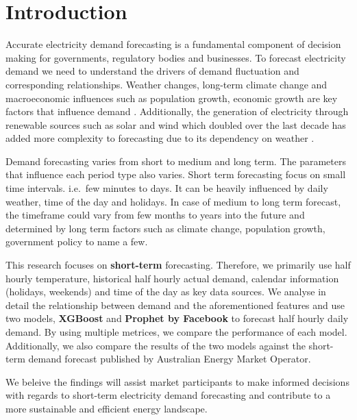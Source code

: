 \documentclass[mstat,12pt]{unswthesis}
\begin{document}



\chapter{Introduction}\label{introduction}

Accurate electricity demand forecasting is a fundamental component of
decision making for governments, regulatory bodies and businesses. To
forecast electricity demand we need to understand the drivers of demand
fluctuation and corresponding relationships. Weather changes, long-term
climate change and macroeconomic influences such as population growth,
economic growth are key factors that influence demand \cite{a2024_nem}.
Additionally, the generation of electricity through renewable sources
such as solar and wind which doubled over the last decade has added more
complexity to forecasting due to its dependency on weather
\cite{energygovau_2024_renewables}.

Demand forecasting varies from short to medium and long term. The
parameters that influence each period type also varies. Short term
forecasting focus on small time intervals. i.e.~few minutes to days. It
can be heavily influenced by daily weather, time of the day and
holidays. In case of medium to long term forecast, the timeframe could
vary from few months to years into the future and determined by long
term factors such as climate change, population growth, government
policy to name a few.

This research focuses on \textbf{short-term} forecasting. Therefore, we
primarily use half hourly temperature, historical half hourly actual
demand, calendar information (holidays, weekends) and time of the day as
key data sources. We analyse in detail the relationship between demand
and the aforementioned features and use two models, \textbf{XGBoost} and
\textbf{Prophet by Facebook} to forecast half hourly daily demand. By
using multiple metrices, we compare the performance of each model.
Additionally, we also compare the results of the two models against the
short-term demand forecast published by Australian Energy Market
Operator.

We beleive the findings will assist market participants to make informed
decisions with regards to short-term electricity demand forecasting and
contribute to a more sustainable and efficient energy landscape.

\bigskip
\end{document}
